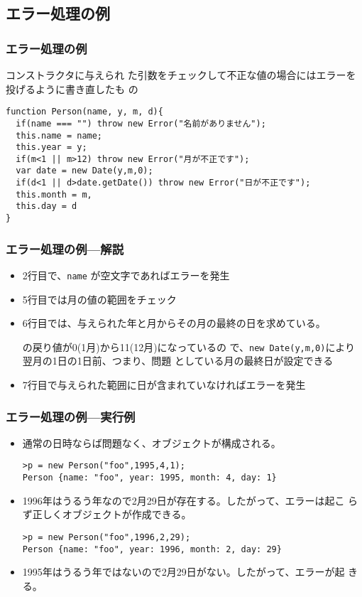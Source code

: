 \subsection{エラー処理の例}
\begin{frame}[containsverbatim]
 \frametitle{エラー処理の例}
コンストラクタに与えられ
	た引数をチェックして不正な値の場合にはエラーを投げるように書き直したも
 の
 {\small
\begin{Verbatim}
function Person(name, y, m, d){
  if(name === "") throw new Error("名前がありません");
  this.name = name;
  this.year = y;
  if(m<1 || m>12) throw new Error("月が不正です");
  var date = new Date(y,m,0);
  if(d<1 || d>date.getDate()) throw new Error("日が不正です");
  this.month = m,
  this.day = d
}
\end{Verbatim}
 }
\end{frame}
\begin{frame}[containsverbatim]
 \frametitle{エラー処理の例---解説}
\begin{itemize}
 \item 2行目で、\texttt{name} が空文字であればエラーを発生
 \item 5行目では月の値の範囲をチェック
 \item 6行目では、与えられた年と月からその月の最終の日を求めている。
       
			 の戻り値が0(1月)から11(12月)になっているの
			 で、\texttt{new Date(y,m,0)}により翌月の1日の1日前、つまり、問題
			 としている月の最終日が設定できる
 \item 7行目で与えられた範囲に日が含まれていなければエラーを発生
\end{itemize}
 \end{frame}
\begin{frame}[containsverbatim]
 \frametitle{エラー処理の例---実行例}
\begin{itemize}
 \item 通常の日時ならば問題なく、オブジェクトが構成される。
\begin{Verbatim}
>p = new Person("foo",1995,4,1);
Person {name: "foo", year: 1995, month: 4, day: 1}
\end{Verbatim}
 \item 1996年はうるう年なので2月29日が存在する。したがって、エラーは起こ
			 らず正しくオブジェクトが作成できる。
\begin{Verbatim}
>p = new Person("foo",1996,2,29);
Person {name: "foo", year: 1996, month: 2, day: 29}
\end{Verbatim}
 \item 1995年はうるう年ではないので2月29日がない。したがって、エラーが起
			 きる。
\end{itemize}
 \end{frame}
